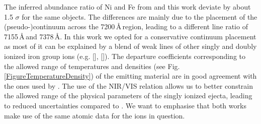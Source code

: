 \documentclass[fleqn,usenatbib]{mnras}
\begin{document}
The inferred abundance ratio of Ni and Fe from \citet{2018MNRAS.477.3567M} and this work deviate by about 1.5 $\sigma$ for the same objects. The differences are mainly due to the placement of the (pseudo-)continuum across the 7200\,\AA\,region, leading to a different line ratio of  7155\,\AA\,and  7378\,\AA. In this work we opted for a conservative continuum placement as most of it can be explained by a blend of weak lines of other singly and doubly ionized iron group ions (e.g. [], []). The departure coefficients corresponding to the allowed range of temperatures and densities (see Fig. \ref{FigureTemperatureDensity}) of the emitting material are in good agreement with the ones used by \citet{2018MNRAS.477.3567M}. The use of the  NIR/VIS relation allows us to better constrain the allowed range of the physical parameters of the singly ionized ejecta, leading to reduced uncertainties compared to \citet{2018MNRAS.477.3567M}. We want to emphasise that both works make use of the same atomic data for the ions in question.
\end{document}
